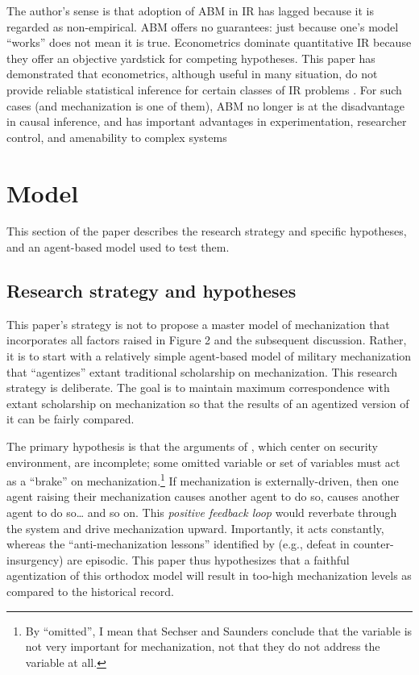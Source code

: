 \documentclass{article}
\begin{document}
The author's sense is that adoption of ABM in IR has lagged because it is
regarded as non-empirical. ABM offers no guarantees: just
because one's model ``works''  does not mean it is true. Econometrics dominate quantitative 
IR because they offer an objective yardstick for competing hypotheses. 
This paper has demonstrated that econometrics, although useful in many situation, do not
provide reliable statistical inference for certain classes of IR problems \citep[c.f.][for a concurring opinion]{king2010hard}. 
For such cases (and mechanization is one of them), ABM no longer is at the
disadvantage in causal inference, and has important advantages in experimentation, 
researcher control, and amenability to complex systems

\section{Model}

This section of the paper describes the research strategy and specific
hypotheses, and an agent-based model used to test them. 

\subsection{Research strategy and hypotheses}

This paper's strategy is not to propose a master
model of mechanization that incorporates all factors raised in Figure 2 and
the subsequent discussion. Rather, it is to start with a relatively simple
agent-based model of military mechanization that ``agentizes'' extant
traditional scholarship on mechanization. This research strategy is deliberate. 
The goal is to maintain maximum correspondence with extant scholarship on mechanization 
so that the results of an agentized version of it can be fairly compared. 

The primary hypothesis is that the arguments of \citet{sechser2010army}, which
center on security environment, are incomplete; some omitted variable or set of
variables must act 
as a ``brake'' on  mechanization.\footnote{By ``omitted'', I mean that Sechser and Saunders conclude that the variable
is not very important for mechanization, not that they do not address the
variable at all.} If mechanization is externally-driven, then one agent raising their
mechanization causes another agent to do so, causes another agent to do so\ldots
and so on. This \textit{positive feedback loop} would reverbate through the
system and drive mechanization upward. Importantly, it acts constantly, whereas
the ``anti-mechanization lessons'' identified by \citet{sechser2010army} (e.g.,
defeat in counter-insurgency) are episodic. This paper thus hypothesizes that a
faithful agentization of this orthodox model will result in too-high
mechanization levels as compared to the historical record. 
\end{document}
